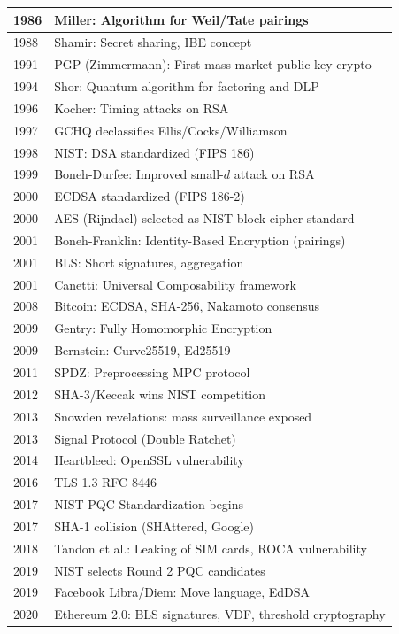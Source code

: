 \begin{tabularx}{\linewidth}{|l|X|}
1986 & Miller: Algorithm for Weil/Tate pairings \\ \hline
1988 & Shamir: Secret sharing, IBE concept \\ \hline
1991 & PGP (Zimmermann): First mass-market public-key crypto \\ \hline
1994 & Shor: Quantum algorithm for factoring and DLP \\ \hline
1996 & Kocher: Timing attacks on RSA \\ \hline
1997 & GCHQ declassifies Ellis/Cocks/Williamson \\ \hline
1998 & NIST: DSA standardized (FIPS 186) \\ \hline
1999 & Boneh-Durfee: Improved small-$d$ attack on RSA \\ \hline
2000 & ECDSA standardized (FIPS 186-2) \\ \hline
2000 & AES (Rijndael) selected as NIST block cipher standard \\ \hline
2001 & Boneh-Franklin: Identity-Based Encryption (pairings) \\ \hline
2001 & BLS: Short signatures, aggregation \\ \hline
2001 & Canetti: Universal Composability framework \\ \hline
2008 & Bitcoin: ECDSA, SHA-256, Nakamoto consensus \\ \hline
2009 & Gentry: Fully Homomorphic Encryption \\ \hline
2009 & Bernstein: Curve25519, Ed25519 \\ \hline
2011 & SPDZ: Preprocessing MPC protocol \\ \hline
2012 & SHA-3/Keccak wins NIST competition \\ \hline
2013 & Snowden revelations: mass surveillance exposed \\ \hline
2013 & Signal Protocol (Double Ratchet) \\ \hline
2014 & Heartbleed: OpenSSL vulnerability \\ \hline
2016 & TLS 1.3 RFC 8446 \\ \hline
2017 & NIST PQC Standardization begins \\ \hline
2017 & SHA-1 collision (SHAttered, Google) \\ \hline
2018 & Tandon et al.: Leaking of SIM cards, ROCA vulnerability \\ \hline
2019 & NIST selects Round 2 PQC candidates \\ \hline
2019 & Facebook Libra/Diem: Move language, EdDSA \\ \hline
2020 & Ethereum 2.0: BLS signatures, VDF, threshold cryptography \\ \hline

\end{tabularx}
